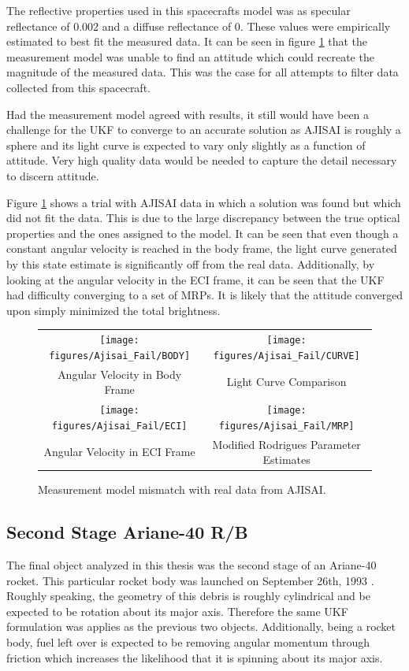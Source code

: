The reflective properties used in this spacecrafts model was as specular reflectance of 0.002 and a diffuse reflectance of 0. These values were empirically estimated to best fit the measured data. It can be seen in figure \ref{ajisa_fail} that the measurement model was unable to find an attitude which could recreate the magnitude of the measured data. This was the case for all attempts to filter data collected from this spacecraft.

Had the measurement model agreed with results, it still would have been a challenge for the UKF to converge to an accurate solution as AJISAI is roughly a sphere and its light curve is expected to vary only slightly as a function of attitude. Very high quality data would be needed to capture the detail necessary to discern attitude.

Figure \ref{ajisa_fail} shows a trial with AJISAI data in which a solution was found but which did not fit the data. This is due to the large discrepancy between the true optical properties and the ones assigned to the model. It can be seen that even though a constant angular velocity is reached in the body frame, the light curve generated by this state estimate is significantly off from the real data. Additionally, by looking at the angular velocity in the ECI frame, it can be seen that the UKF had difficulty converging to a set of MRPs. It is likely that the attitude converged upon simply minimized the total brightness.

\begin{figure}[H]
	\begin{tabular}{cc}
		\texttt{[image: figures/Ajisai\_Fail/BODY]} &
		\texttt{[image: figures/Ajisai\_Fail/CURVE]} \\
		Angular Velocity in Body Frame & Light Curve Comparison \\
		\texttt{[image: figures/Ajisai\_Fail/ECI]} &
		\texttt{[image: figures/Ajisai\_Fail/MRP]} \\
		Angular Velocity in ECI Frame & Modified Rodrigues Parameter Estimates
	\end{tabular}
	\caption{Measurement model mismatch with real data from AJISAI.}
	\label{ajisa_fail}
\end{figure}

\subsection{Second Stage Ariane-40 R/B}

The final object analyzed in this thesis was the second stage of an Ariane-40 rocket. This particular rocket body was launched on September 26th, 1993 \cite{Ariane_Date}. Roughly speaking, the geometry of this debris is roughly cylindrical and be expected to be rotation about its major axis. Therefore the same UKF formulation was applies as the previous two objects. Additionally, being a rocket body, fuel left over is expected to be removing angular momentum through friction which 
increases the likelihood that it is spinning about its major axis.

